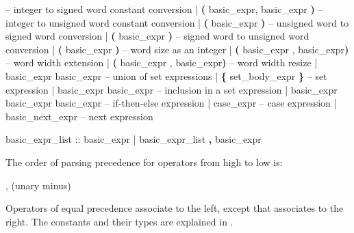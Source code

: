 \begin{Grammar}
                                    -- integer to signed word constant conversion
    |  \textbf{(} basic_expr, basic_expr \textbf{)}        
                                    -- integer to unsigned word constant conversion
    |  \textbf{(} basic_expr \textbf{)}         -- unsigned word to signed word conversion
    |  \textbf{(} basic_expr \textbf{)}       -- signed word to unsigned word conversion
    |  \textbf{(} basic_expr \textbf{)}         -- word size as an integer
    |  \textbf{(} basic_expr , basic_expr\textbf{)}  
                                    -- word width extension
    |  \textbf{(} basic_expr , basic_expr\textbf{)}  
                                    -- word width resize
    | basic_expr  basic_expr   -- union of set expressions 
    | \textbf{\{} set_body_expr \textbf{\}}             -- set expression
    | basic_expr  basic_expr      -- inclusion in a set expression
    | basic_expr  basic_expr \operator{:} basic_expr      
                                    -- if-then-else expression 
    | case_expr                     -- case expression
    | basic_next_expr               -- next expression

basic_expr_list ::
      basic_expr
    | basic_expr_list \textbf{,} basic_expr
\end{Grammar}

\noindent The order of parsing precedence for operators from high to
low is:
%
\begin{Grammar}
      \operator{[ ]}, \operator{[ : ]}
      \operator{!}
      \operator{::}
      \operator{-} (unary minus)
      \operator{*}   \operator{/}   
      \operator{+}   \operator{-}
      \operator{<<}   \operator{>>}
      \operator{=}   \operator{!=}   \operator{<}   \operator{>}   \operator{<=}   \operator{>=}
      \operator{\&}
      \operator{|}      
      \itebullet
      \operator{<->}
      \operator{->}
\end{Grammar}
%
Operators of equal precedence associate to the left, except \operator{->}
that associates to the right.
%
The constants and their types are explained in .

